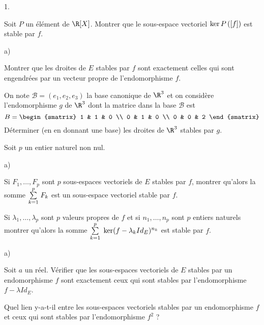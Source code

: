 \documentclass[11pt]{article}%
\begin{document}
\begin{noliste}{1.}
 \setlength{\itemsep}{4mm}
\item Soit $P$ un élément de $\R[X]$. Montrer que le sous-espace
vectoriel $\ker P\left(\left[ {f} \right]\right)$ est stable par $f$.

\item 

\begin{noliste}{a)}
 \setlength{\itemsep}{2mm}
\item Montrer que les droites de $E$ stables par $f$ sont exactement
celles
qui sont engendrées par un vecteur propre de l'endomorphisme $f$.

\item On note $\mathcal{B} = (e_{1},e_{2},e_{3})$ la base canonique de
$\R^{3}$ et on considère l'endomorphisme $g$ de $\R^{3}$ dont
la matrice dans la base $\mathcal{B}$ est 
\[
B = 
\begin{smatrix}
1 & 1 & 0 \\
0 & 1 & 0 \\
0 & 0 & 2
\end{smatrix}
\]
Déterminer (en en donnant une base) les droites de $\R^{3}$ stables
par $g$.
\end{noliste}

\item Soit $p$ un entier naturel non nul.

\begin{noliste}{a)}
 \setlength{\itemsep}{2mm}
\item Si $F_{1},\dots,F_{p}$ sont $p$ sous-espaces vectoriels de $E$
stables par $f$, montrer qu'alors la somme ${\textstyle\sum\limits_{k = 1}^{p}}\hspace{.1cm}F_{k}$ est
un sous-espace vectoriel stable par $f$.

\item Si $\lambda_{1},\dots,\lambda_{p}$ sont $p$ valeurs propres de
$f$
et si $n_{1},\dots,n_{p}$ sont $p$ entiers naturels montrer qu'alors la
somme ${\textstyle\sum\limits_{k = 1}^{p}}\hspace{.1cm}\ker (f-\lambda_{k}Id_{E})^{n_{k}}$ est stable
par $f$.
\end{noliste}

\item 

\begin{noliste}{a)}
 \setlength{\itemsep}{2mm}
\item Soit $a$ un réel. Vérifier que les sous-espaces vectoriels de $E$
stables par un endomorphisme $f$ sont exactement ceux qui sont stables
par
l'endomorphisme $f-\lambda Id_{E}$.

\item Quel lien y-a-t-il entre les sous-espaces vectoriels stables par
un
endomorphisme $f$ et ceux qui sont stables par l'endomorphisme $f^{2}$
?


\end{noliste}
\end{noliste}
\end{document}
